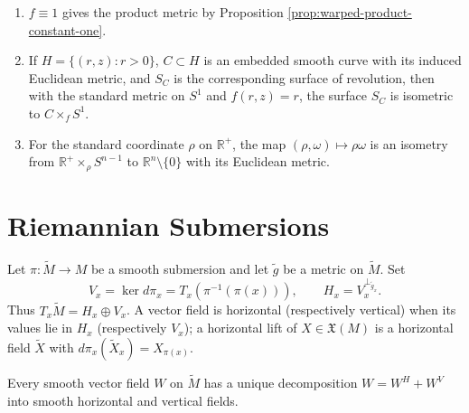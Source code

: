 \begin{example}
\label{ex:warped-products}

\begin{enumerate}
\item[(a)] $f\equiv1$ gives the product metric by Proposition \ref{prop:warped-product-constant-one}.
\item[(b)] If $H=\{(r,z):r>0\}$, $C\subset H$ is an embedded smooth curve
with its induced Euclidean metric, and $S_C$ is the corresponding surface of
revolution, then with the standard metric on $S^1$ and $f(r,z)=r$, the surface
$S_C$ is isometric to $C\times_fS^1$.
\item[(c)] For the standard coordinate $\rho$ on $\mathbb R^+$, the map
$(\rho,\omega)\mapsto\rho\omega$ is an isometry from
$\mathbb R^+\times_\rho S^{n-1}$ to $\mathbb R^n\setminus\{0\}$ with its
Euclidean metric.
\end{enumerate}
\end{example}

\section{Riemannian Submersions}

Let $\pi:\tilde M\to M$ be a smooth submersion and let $\tilde g$ be a metric on $\tilde M$. Set
\[
V_x=\ker d\pi_x=T_x(\pi^{-1}(\pi(x))),\qquad H_x=V_x^{\perp_{\tilde g_x}}.
\]
Thus $T_x\tilde M=H_x\oplus V_x$. A vector field is horizontal (respectively vertical) when its values lie in $H_x$ (respectively $V_x$); a horizontal lift of $X\in\mathfrak X(M)$ is a horizontal field $\tilde X$ with $d\pi_x(\tilde X_x)=X_{\pi(x)}$.

\begin{proposition}
\label{prop:horizontal-vector-field-properties}





Every smooth vector field $W$ on $\tilde M$ has a unique decomposition $W=W^H+W^V$ into smooth horizontal and vertical fields.
\end{proposition}

